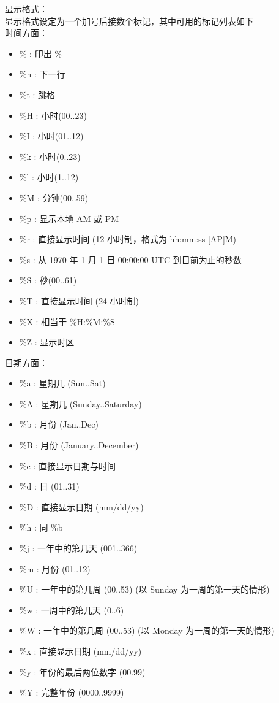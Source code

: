 显示格式：
\\
显示格式设定为一个加号后接数个标记，其中可用的标记列表如下
\\
时间方面：
\begin{itemize}
\item \% : 印出 \%
\item\%n : 下一行
\item\%t : 跳格
\item\%H : 小时(00..23)
\item\%I : 小时(01..12)
\item\%k : 小时(0..23)
\item\%l : 小时(1..12)
\item\%M : 分钟(00..59)
\item\%p : 显示本地 AM 或 PM
\item\%r : 直接显示时间 (12 小时制，格式为 hh:mm:ss [AP]M)
\item\%s : 从 1970 年 1 月 1 日 00:00:00 UTC 到目前为止的秒数
\item\%S : 秒(00..61)
\item\%T : 直接显示时间 (24 小时制)
\item\%X : 相当于 \%H:\%M:\%S
\item\%Z : 显示时区
\end{itemize}

日期方面：
\begin{itemize}
\item\%a : 星期几 (Sun..Sat)
\item\%A : 星期几 (Sunday..Saturday)
\item\%b : 月份 (Jan..Dec)
\item\%B : 月份 (January..December)
\item\%c : 直接显示日期与时间
\item\%d : 日 (01..31)
\item\%D : 直接显示日期 (mm/dd/yy)
\item\%h : 同 \%b
\item\%j : 一年中的第几天 (001..366)
\item\%m : 月份 (01..12)
\item\%U : 一年中的第几周 (00..53) (以 Sunday 为一周的第一天的情形)
\item\%w : 一周中的第几天 (0..6)
\item\%W : 一年中的第几周 (00..53) (以 Monday 为一周的第一天的情形)
\item\%x : 直接显示日期 (mm/dd/yy)
\item\%y : 年份的最后两位数字 (00.99)
\item\%Y : 完整年份 (0000..9999)
\end{itemize}

